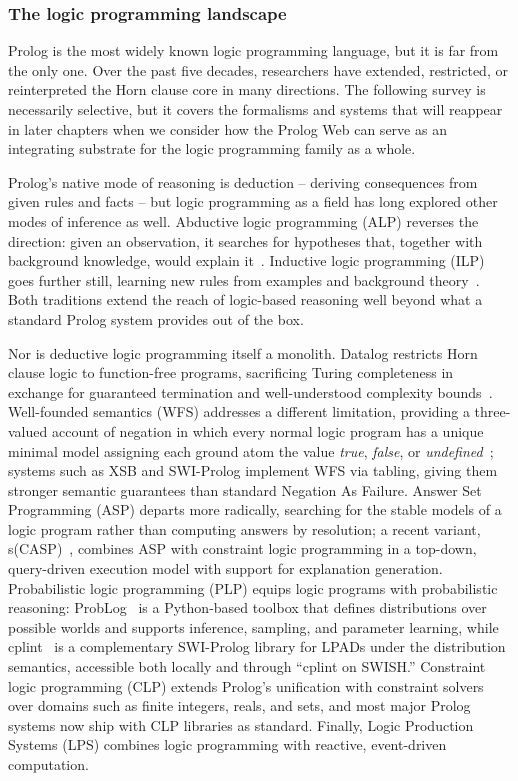 \subsubsection{The logic programming landscape}
\label{sec:lp-landscape}

Prolog is the most widely known logic programming language, but it is far from the only one. Over the past five decades, researchers have extended, restricted, or reinterpreted the Horn clause core in many directions. The following survey is necessarily selective, but it covers the formalisms and systems that will reappear in later chapters when we consider how the Prolog Web can serve as an integrating substrate for the logic programming family as a whole.

Prolog's native mode of reasoning is deduction -- deriving consequences from given rules and facts -- but logic programming as a field has long explored other modes of inference as well. Abductive logic programming (ALP) reverses the direction: given an observation, it searches for hypotheses that, together with background knowledge, would explain it~\citep{Kakas1992}. Inductive logic programming (ILP) goes further still, learning new rules from examples and background theory~\citep{Muggleton1994}. Both traditions extend the reach of logic-based reasoning well beyond what a standard Prolog system provides out of the box.

Nor is deductive logic programming itself a monolith. Datalog restricts Horn clause logic to function-free programs, sacrificing Turing completeness in exchange for guaranteed termination and well-understood complexity bounds~\citep{Ceri1989,Green2013}. Well-founded semantics (WFS) addresses a different limitation, providing a three-valued account of negation in which every normal logic program has a unique minimal model assigning each ground atom the value \emph{true}, \emph{false}, or \emph{undefined}~\citep{VanGelder1991}; systems such as XSB and SWI-Prolog implement WFS via tabling, giving them stronger semantic guarantees than standard Negation As Failure. Answer Set Programming (ASP) departs more radically, searching for the stable models of a logic program rather than computing answers by resolution; a recent variant, s(CASP)~\citep{Arias2018}, combines ASP with constraint logic programming in a top-down, query-driven execution model with support for explanation generation. Probabilistic logic programming (PLP) equips logic programs with probabilistic reasoning: ProbLog~\citep{DeRaedt2007} is a Python-based toolbox that defines distributions over possible worlds and supports inference, sampling, and parameter learning, while cplint~\citep{Riguzzi2018} is a complementary SWI-Prolog library for LPADs under the distribution semantics, accessible both locally and through ``cplint on SWISH.'' Constraint logic programming (CLP) extends Prolog's unification with constraint solvers over domains such as finite integers, reals, and sets, and most major Prolog systems now ship with CLP libraries as standard. Finally, Logic Production Systems (LPS) \citep{kowalski2015reactive} combines logic programming with reactive, event-driven computation.

